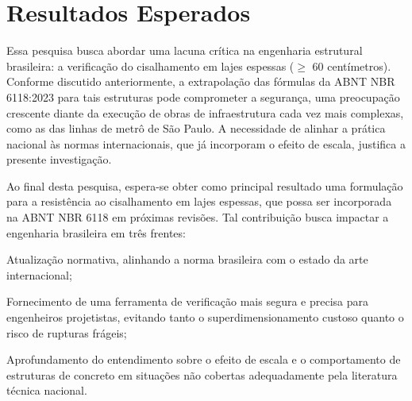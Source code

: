 
\chapter[Resultados Esperados]{Resultados Esperados}
Essa pesquisa busca abordar uma lacuna crítica na engenharia estrutural brasileira: a verificação do cisalhamento em lajes espessas ($\geq$ 60 centímetros). Conforme discutido anteriormente, a extrapolação das fórmulas da ABNT NBR 6118:2023 para tais estruturas pode comprometer a segurança, uma preocupação crescente diante da execução de obras de infraestrutura cada vez mais complexas, como as das linhas de metrô de São Paulo. A necessidade de alinhar a prática nacional às normas internacionais, que já incorporam o efeito de escala, justifica a presente investigação.

Ao final desta pesquisa, espera-se obter como principal resultado uma formulação para a resistência ao cisalhamento em lajes espessas, que possa ser incorporada na ABNT NBR 6118 em próximas revisões. Tal contribuição busca impactar a engenharia brasileira em três frentes: 

\begin{alineas}
	\item Atualização normativa, alinhando a norma brasileira com o estado da arte internacional;
	\item Fornecimento de uma ferramenta de verificação mais segura e precisa para engenheiros projetistas, evitando tanto o superdimensionamento custoso quanto o risco de rupturas frágeis;
	\item Aprofundamento do entendimento sobre o efeito de escala e o comportamento de estruturas de concreto em situações não cobertas adequadamente pela literatura técnica nacional.
\end{alineas}



\postextual

\nocite{*}

%
\printbibliography



